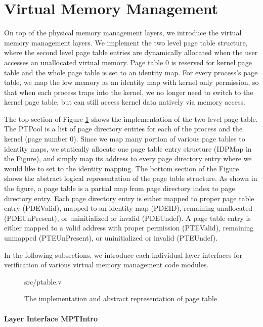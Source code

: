 \section{Virtual Memory Management}

On top of the physical memory management layers, we introduce the
virtual memory management layers.
We implement the two level page table structure, where the second level
page table entries are dynamically allocated when the user accesses an unallocated virtual memory.
Page table 0 is reserved for kernel page table and the whole page table is set to an identity map.
For every process's page table, we map the low memory as an identity map with kernel only permission,
so that when each process traps into the kernel, we no longer need to switch to the kernel page table, 
but can still access kernel data natively via memory access.

The top section of Figure \ref{fig:ptable_v} shows the implementation of the two level page table.
The \textsf{PTPool} is a list of page directory entries for each of the process and the kernel (page number 0).
Since we map many portion of various page tables to identity maps, we statically allocate one page table entry
structure (\textsf{IDPMap} in the Figure), and simply map its address to every page directory entry where
we would like to set to the identity mapping.
The bottom section of the Figure shows the abstract logical representation of the page table structure.
As shown in the figure, a page table is a partial map from page directory index to page directory entry.
Each page directory entry is either mapped to proper page table entry (\textsf{PDEValid}),
mapped to an identity map (\textsf{PDEID}), remaining unallocated (\textsf{PDEUnPresent}), or uninitialized or invalid (\textsf{PDEUndef}).
A page table entry is either mapped to a valid address with proper permission (\textsf{PTEValid}), remaining unmapped (\textsf{PTEUnPresent}),
or uninitialized or invalid (\textsf{PTEUndef}).

In the following subsections, we introduce each individual layer interfaces for verification of various
virtual memory management code modules.

\begin{figure}
	 {src/ptable.v}
	\caption{The implementation and abstract representation of page table}
	\label{fig:ptable_v}
\end{figure}

\paragraph{Layer Interface MPTIntro}

